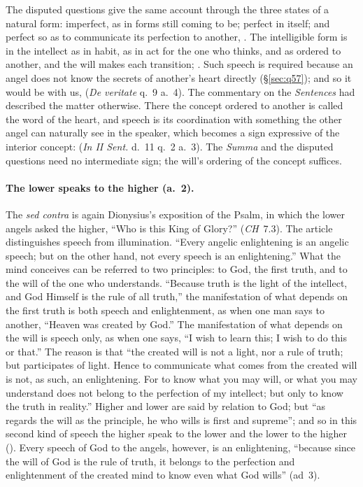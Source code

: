 The disputed questions give the same account through the three states of a
natural form: imperfect, as in forms still coming to be; perfect in itself;
and perfect so as to communicate its perfection to another, . The intelligible
form is in the intellect as in habit, as in act for the one who thinks, and
as ordered to another, and the will makes each transition; . Such speech is required because an angel does
not know the secrets of another's heart directly (\S\ref{sec:q57}); and so it would be with us,  (\emph{De
veritate} q.~9 a.~4). The commentary on
the \emph{Sentences} had described the matter otherwise. There the concept
ordered to another is called the word of the heart, and speech is its
coordination with something the other angel can naturally see in the
speaker, which becomes a sign expressive of the interior concept:  (\emph{In II
Sent.} d.~11 q.~2 a.~3). The \emph{Summa} and the disputed questions need no
intermediate sign; the will's ordering of the concept suffices.

\paragraph{The lower speaks to the higher (a.~2).} The \emph{sed contra} is
again Dionysius's exposition of the Psalm, in which the lower angels asked
the higher, ``Who is this King of Glory?'' (\emph{CH}~7.3). The article
distinguishes speech from illumination. ``Every angelic enlightening is an
angelic speech; but on the other hand, not every speech is an enlightening.''
What the mind conceives can be referred to two principles: to God, the first
truth, and to the will of the one who understands. ``Because truth is the
light of the intellect, and God Himself is the rule of all truth,'' the
manifestation of what depends on the first truth is both speech and
enlightenment, as when one man says to another, ``Heaven was created by
God.'' The manifestation of what depends on the will is speech only, as when
one says, ``I wish to learn this; I wish to do this or that.'' The reason is
that ``the created will is not a light, nor a rule of truth; but
participates of light. Hence to communicate what comes from the created will
is not, as such, an enlightening. For to know what you may will, or what you
may understand does not belong to the perfection of my intellect; but only
to know the truth in reality.'' Higher and lower are said by relation to
God; but ``as regards the will as the principle, he who wills is first and
supreme''; and so in this second kind of speech the higher speak to the
lower and the lower to the higher (). Every speech of
God to the angels, however, is an enlightening, ``because since the will of
God is the rule of truth, it belongs to the perfection and enlightenment of
the created mind to know even what God wills'' (ad~3).


